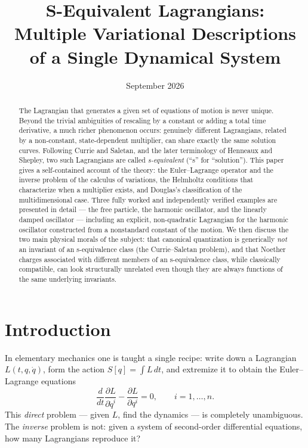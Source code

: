 \documentclass[11pt]{article}
\title{S-Equivalent Lagrangians:\\[2pt] \large Multiple Variational Descriptions of a Single Dynamical System}
\author{}
\date{September 2026}
\theoremstyle{remark}
\begin{document}
\maketitle

\begin{abstract}
\noindent
The Lagrangian that generates a given set of equations of motion is never unique. Beyond the trivial ambiguities of rescaling by a constant or adding a total time derivative, a much richer phenomenon occurs: genuinely different Lagrangians, related by a non-constant, state-dependent multiplier, can share exactly the same solution curves. Following Currie and Saletan, and the later terminology of Henneaux and Shepley, two such Lagrangians are called \emph{s-equivalent} (``s'' for ``solution''). This paper gives a self-contained account of the theory: the Euler--Lagrange operator and the inverse problem of the calculus of variations, the Helmholtz conditions that characterize when a multiplier exists, and Douglas's classification of the multidimensional case. Three fully worked and independently verified examples are presented in detail --- the free particle, the harmonic oscillator, and the linearly damped oscillator --- including an explicit, non-quadratic Lagrangian for the harmonic oscillator constructed from a nonstandard constant of the motion. We then discuss the two main physical morals of the subject: that canonical quantization is generically \emph{not} an invariant of an s-equivalence class (the Currie--Saletan problem), and that Noether charges associated with different members of an s-equivalence class, while classically compatible, can look structurally unrelated even though they are always functions of the same underlying invariants.
\end{abstract}

\tableofcontents

\section{Introduction}

In elementary mechanics one is taught a single recipe: write down a Lagrangian $L(t,q,\dot q)$, form the action $S[q]=\int L\,dt$, and extremize it to obtain the Euler--Lagrange equations
\begin{equation}
\frac{d}{dt}\frac{\partial L}{\partial \dot q^i}-\frac{\partial L}{\partial q^i}=0 , \qquad i=1,\dots,n .
\label{eq:EL-generic}
\end{equation}
This \emph{direct} problem --- given $L$, find the dynamics --- is completely unambiguous. The \emph{inverse} problem is not: given a system of second-order differential equations, how many Lagrangians reproduce it?
\end{document}
